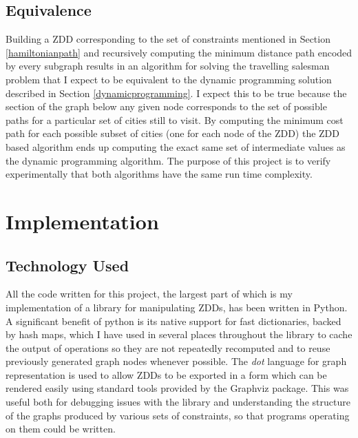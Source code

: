 \documentclass[12pt,a4paper,twoside,openright]{report}
\begin{document}
\section{Equivalence}
Building a ZDD corresponding to the set of constraints mentioned in Section \ref{hamiltonianpath} and recursively computing the minimum distance path encoded by every subgraph results in an algorithm for solving the travelling salesman problem that I expect to be equivalent to the dynamic programming solution described in Section \ref{dynamicprogramming}. I expect this to be true because the section of the graph below any given node corresponds to the set of possible paths for a particular set of cities still to visit. By computing the minimum cost path for each possible subset of cities (one for each node of the ZDD) the ZDD based algorithm ends up computing the exact same set of intermediate values as the dynamic programming algorithm. The purpose of this project is to verify experimentally that both algorithms have the same run time complexity.

\chapter{Implementation}

\section{Technology Used}
All the code written for this project, the largest part of which is my implementation of a library for manipulating ZDDs, has been written in Python. A significant benefit of python is its native support for fast dictionaries, backed by hash maps, which I have used in several places throughout the library to cache the output of operations so they are not repeatedly recomputed and to reuse previously generated graph nodes whenever possible.  The \textit{dot} language for graph representation is used to allow ZDDs to be exported in a form which can be rendered easily using standard tools provided by the Graphviz package. This was useful both for debugging issues with the library and understanding the structure of the graphs produced by various sets of constraints, so that programs operating on them could be written.
\end{document}
